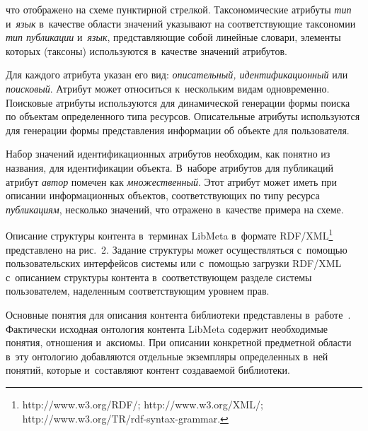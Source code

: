 \begin{multicols}{2}

\noindent 
 что отображено
на схеме пунктирной стрелкой. Таксономические 
атрибуты \textit{тип} и~\textit{язык} в~качестве области значений указывают на 
соответствующие таксономии \textit{тип пуб\-ли\-ка\-ции} и~\textit{язык}, 
пред\-став\-ля\-ющие собой линейные словари, элементы которых (таксоны) 
используются в~качестве значений атрибутов. 
    
    Для каждого атрибута указан его вид: \textit{описательный, 
идентификационный} или \textit{поисковый}. Атрибут может относиться 
к~нескольким видам одновременно. Поисковые атрибуты используются для 
динамической генерации формы поиска по объектам определенного типа 
ресурсов. Описательные атрибуты используются для генерации формы 
представления информации об объекте для пользова\-теля.
{

} 

Набор значений 
идентификационных атрибутов необходим, как понятно из названия, для 
идентификации объекта. В~наборе атрибутов для публикаций атрибут 
\textit{автор} помечен как \textit{множественный}. Этот атрибут может 
иметь при описании информационных объектов, соответствующих по типу 
ресурса \textit{публикациям}, несколько значений, что отражено в~качестве 
примера на схеме.
     


    Описание структуры контента в~терминах \mbox{LibMeta} в~формате 
RDF/XML\footnote{{\sf http://www.w3.org/RDF/}; {\sf http://www.w3.org/XML/}; {\sf 
http://www.w3.org/TR/rdf-syntax-grammar.}} представлено на рис.~2. Задание 
структуры может осуществляться с~по\-мощью пользовательских 
интерфейсов системы или с~помощью загрузки RDF/XML с~описанием 
структуры контента в~соответствующем разделе системы пользователем, 
наделенным соответствующим уровнем прав.
    


    Основные понятия для описания контента биб\-лио\-те\-ки представлены 
в~работе~\cite{5-ser}. Фактически исходная онтология контента LibMeta 
содержит необходимые понятия, отношения и~аксиомы. При описании 
конкретной предметной области в~эту онтологию добавляются отдельные 
экземпляры определенных в~ней понятий, которые и~составляют контент 
создаваемой библиотеки. 



    
    

\pagebreak

\end{multicols}

